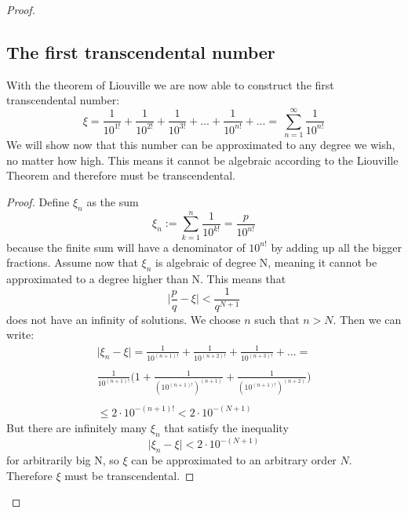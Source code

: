 \documentclass{article}
\theoremstyle{definition}
\begin{document}
\begin{proof}
\newpage

\subsection{The first transcendental number}
With the theorem of Liouville we are now able to construct the first transcendental number:
\begin{equation}
    \xi = \frac{1}{10^{1!}} + \frac{1}{10^{2!}} + \frac{1}{10^{3!}} + ... + \frac{1}{10^{n!}} + ... = \: \sum _{n=1} ^{\infty} \frac{1}{10^{n!}}
\end{equation}
We will show now that this number can be approximated to any degree we wish, no matter how high. This means it cannot be algebraic according to the Liouville Theorem and therefore must be transcendental. 
\begin{proof}
    Define $\xi_n$ as the sum
    \begin{equation}
        \xi _n := \sum _{k=1}^{n} \frac{1}{10^{k!}} = \frac{p}{10^{n!}}
    \end{equation}
    because the finite sum will have a denominator of $10^{n!}$ by adding up all the bigger fractions. Assume now that $\xi_n$ is algebraic of degree N, meaning it cannot be approximated to a degree higher than N. This means that
    \begin{equation}
        \mid \frac{p}{q} - \xi \mid < \frac{1}{q^{N+1}} 
    \end{equation}
    does not have an infinity of solutions.
    We choose $n$ such that $n>N$. Then we can write:
    \begin{align}
        \mid \xi_n - \xi \mid = \frac{1}{10^{(n+1)!}} + \frac{1}{10^{(n+2)!}} + \frac{1}{10^{(n+3)!}} + ...  = \\
        \\
         \frac{1}{10^{(n+1)!}}\Big(1 +  \frac{1}{(10^{(n+1)!})^{ (n+1)}} +\frac{1}{(10^{(n+1)!})^{ (n+2)}} \Big)\\
         \\
         \leq 2\cdot 10^{-(n+1)!} < 2\cdot 10^{-(N+1)}
    \end{align}
    But there are infinitely many $\xi_n$ that satisfy the inequality
    \begin{equation}
        \mid \xi_n - \xi \mid < 2\cdot 10^{-(N+1)}
    \end{equation}
    for arbitrarily big N, so $\xi$ can be approximated to an arbitrary order $N$. Therefore $\xi$ must be transcendental.
\end{proof}




\end{proof}
\end{document}
